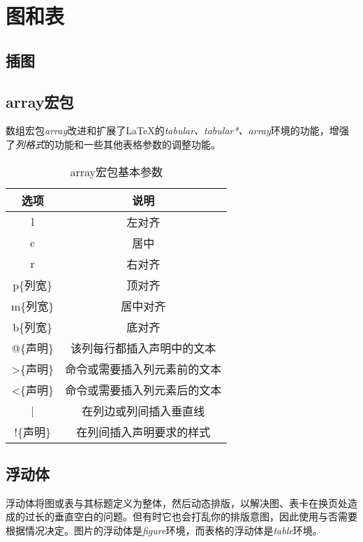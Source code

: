 {\let\clearpage\relax \chapter{图和表}}

\section{插图}

\section{array宏包}

数组宏包\emph{array}改进和扩展了\LaTeX 的\emph{tabular、tabular*、array}环境的功能，增强了\emph{列格式}的功能和一些其他表格参数的调整功能。

\begin{table}[!ht]
	\caption{array宏包基本参数}
	\begin{center}
	\begin{tabular}{|c|c|}
	\hline 
	选项	&	说明 \\ 
	\hline
	l	&	左对齐 \\ 
	\hline
	c	&	居中 \\ 
	\hline
	r	&	右对齐 \\ 
	\hline
	p\{列宽\}	&	顶对齐 \\ 
	\hline
	m\{列宽\}	&	居中对齐 \\ 
	\hline
	b\{列宽\}	&	底对齐 \\ 
	\hline
	@\{声明\}	&	该列每行都插入声明中的文本 \\ 
	\hline
	>\{声明\}	&	命令或需要插入列元素前的文本 \\ 
	\hline
	<\{声明\}	&	命令或需要插入列元素后的文本 \\ 
	\hline
	|	&	在列边或列间插入垂直线 \\ 
	\hline
	!\{声明\}	&	在列间插入声明要求的样式 \\ 
	\hline
	\end{tabular}
\end{center}
\end{table}

\section{浮动体}

浮动体将图或表与其标题定义为整体，然后动态排版，以解决图、表卡在换页处造成的过长的垂直空白的问题。但有时它也会打乱你的排版意图，因此使用与否需要根据情况决定。图片的浮动体是\emph{figure}环境，而表格的浮动体是\emph{table}环境。

